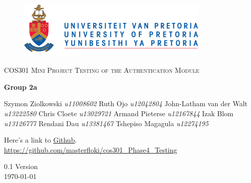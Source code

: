 \begin{titlepage}
	\begin{center}
		
		\begin{figure}[t]
			\centering		
			
			\includegraphics[width=350px]{UP_Logo.png}
		\end{figure}
		
		\textsc{\LARGE COS301 Mini Project \newline\newline Testing of the Authentication Module}
		
		\textbf{\newline Group 2a} \\
		\begin{flushright} \large
			Szymon Ziolkowski \emph{u11008602} \newline
			Ruth Ojo \emph{u12042804} \newline
			John-Latham van der Walt \emph{u13222580} \newline
			Chris Cloete \emph{u13029721} \newline
			Armand Pieterse \emph{u12167844} \newline
			Izak Blom \emph{u13126777} \newline
			Rendani Dau \emph{u13381467} \newline
			Tshepiso Magagula \emph{u12274195} \newline
		\end{flushright}
		
		\vfill
		
	Here's a link to \href{https://github.com/masterfloki/cos301_Phase4_Testing}{Github}.\\
	\url{https://github.com/masterfloki/cos301_Phase4_Testing}

	\vfill

	{\large 0.1 Version}
	\\
	{\large \today}		
		
		
	\end{center}
\end{titlepage}
